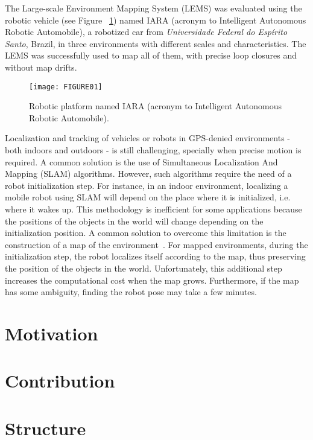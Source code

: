 The Large-scale Environment Mapping System (LEMS) was evaluated using the robotic vehicle (see Figure ~\ref{Fig::FIGURE01}) named IARA (acronym to Intelligent Autonomous Robotic Automobile), a robotized car from \emph{Universidade Federal do Esp\'irito Santo}, Brazil, in three environments with different scales and characteristics. The LEMS was successfully used to map all of them, with precise loop closures and without map drifts.

\begin{figure}[ht]
    \centering
    \texttt{[image: FIGURE01]}
    \caption{Robotic platform named IARA (acronym to Intelligent Autonomous Robotic Automobile).}
    \label{Fig::FIGURE01}
\end{figure}

Localization and tracking of vehicles or robots in GPS-denied environments - both indoors and outdoors - is still challenging, specially when precise motion is required. A common solution is the use of Simultaneous Localization And Mapping (SLAM) algorithms.  However, such algorithms require the need of a robot initialization step. For instance, in an indoor environment, localizing a mobile robot using SLAM will depend on the place where it is initialized, i.e. where it wakes up.  This methodology is inefficient for some applications because the positions of the objects in the world will change depending on the initialization position.  A common solution to overcome this limitation is the construction of a map of the environment~\cite{Thrun00j,moreno2007evolutionary,bashiri2012hybrid}. For mapped environments, during the initialization step, the robot localizes itself according to the map, thus preserving the position of the objects in the world. Unfortunately, this additional step increases the 
computational cost when the map grows. Furthermore, if the map has some ambiguity, finding the robot pose may take a few minutes.



\section{Motivation}

\section{Contribution}

\section{Structure}

